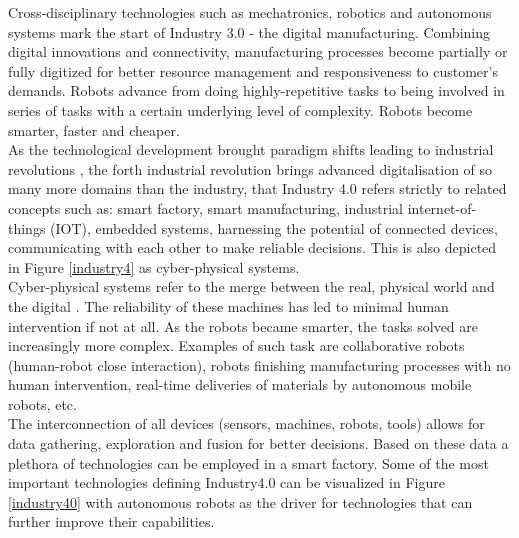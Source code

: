 Cross-disciplinary technologies such as mechatronics, robotics and autonomous systems mark the start of Industry 3.0 - the digital manufacturing. Combining digital innovations and connectivity, manufacturing processes become partially or fully digitized for better resource management and responsiveness to customer's demands. Robots advance from doing highly-repetitive tasks to being involved in series of tasks with a certain underlying level of complexity. Robots become smarter, faster and cheaper. \cite{uk}\\

As the technological development brought paradigm shifts leading to industrial revolutions \cite{industry4}, the forth industrial revolution brings advanced digitalisation of so many more domains than the industry, that Industry 4.0 refers strictly to related concepts such as: smart factory, smart manufacturing, industrial internet-of-things (IOT), embedded systems, harnessing the potential of connected devices, communicating with each other to make reliable decisions. \cite{uk} This is also depicted in Figure \ref{industry4} as cyber-physical systems. \\

Cyber-physical systems refer to the merge between the real, physical world and the digital \cite{industry4}. The reliability of these machines has led to minimal human intervention if not at all. As the robots became smarter, the tasks solved are increasingly more complex. Examples of such task are collaborative robots (human-robot close interaction), robots finishing manufacturing processes with no human intervention, real-time deliveries of materials by autonomous mobile robots, etc.\\

The interconnection of all devices (sensors, machines, robots, tools) allows for data gathering, exploration and fusion for better decisions. Based on these data a plethora of technologies can be employed in a smart factory. Some of the most important technologies defining Industry4.0 can be visualized in Figure \ref{industry40} with autonomous robots as the driver for technologies that can further improve their capabilities.

